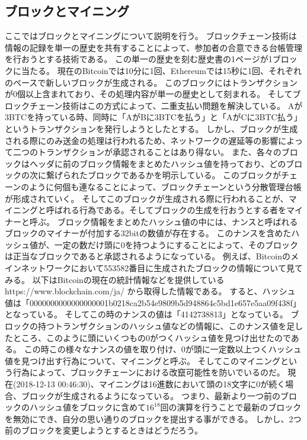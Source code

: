 \subsection{ブロックとマイニング}
ここではブロックとマイニングについて説明を行う。
ブロックチェーン技術は情報の記録を単一の歴史を共有することによって、参加者の合意できる台帳管理を行おうとする技術である。
この単一の歴史を刻む歴史書の1ページが1ブロックに当たる。
現在のBitcoinでは10分に1回、Ethereumでは15秒に1回、それぞれのペースで新しいブロックが生成される。
このブロックにはトランザクションが0個以上含まれており、その処理内容が単一の歴史として刻まれる。
そしてブロックチェーン技術はこの方式によって、二重支払い問題を解決している。
Aが3BTCを持っている時、同時に「AがBに3BTCを払う」と「AがCに3BTC払う」というトランザクションを発行しようとしたとする。
しかし、ブロックが生成される際にのみ送金の処理は行われるため、ネットワークの遅延等の影響によって二つのトランザクションが承認されることはあり得ない。
また、各々のブロックはヘッダに前のブロック情報をまとめたハッシュ値を持っており、どのブロックの次に繋げられたブロックであるかを明示している。
このブロックがチェーンのように何個も連なることによって、ブロックチェーンという分散管理台帳が形成されていく。
そしてこのブロックが生成される際に行われることが、マイニングと呼ばれる行為である。そしてブロックの生成を行おうとする者をマイナーと呼ぶ。
ブロック情報をまとめたハッシュ値の中には、ナンスと呼ばれるブロックのマイナーが付加する32bitの数値が存在する。
このナンスを含めたハッシュ値が、一定の数だけ頭に0を持つようにすることによって、そのブロックは正当なブロックであると承認されるようになっている。
例えば、Bitcoinのメインネットワークにおいて553582番目に生成されたブロックの情報について見てみる。
以下はBitcoinの現在の統計情報などを提供しているhttps://www.blockchain.com/ja/ から取得した情報である。
すると、ハッシュ値は「0000000000000000001b0218ca2b54e9809b5d948864c5bd1e657e5aa09f438f」となっている。
そしてこの時のナンスの値は「4142738813」となっている。
ブロックの持つトランザクションのハッシュ値などの情報に、このナンス値を足したところ、このように頭にいくつもの0がつくハッシュ値を見つけ出せたのである。
この時この様々なナンスの値を取り付け、0が頭に一定数以上つくハッシュ値を見つけ出す行為について、マイニングと呼ぶ。
そしてこのマイニングという行為によって、ブロックチェーンにおける改竄可能性を防いでいるのだ。
現在(2018-12-13 00:46:30)、マイニングは16進数において頭の18文字に0が続く場合、ブロックが生成されるようになっている。
つまり、最新より一つ前のブロックのハッシュ値をブロックに含めて\(16^18\)回の演算を行うことで最新のブロックを無効にでき、自分の思い通りのブロックを提出する事ができる。
しかし、2つ前のブロックを変更しようとするときはどうだろう。
